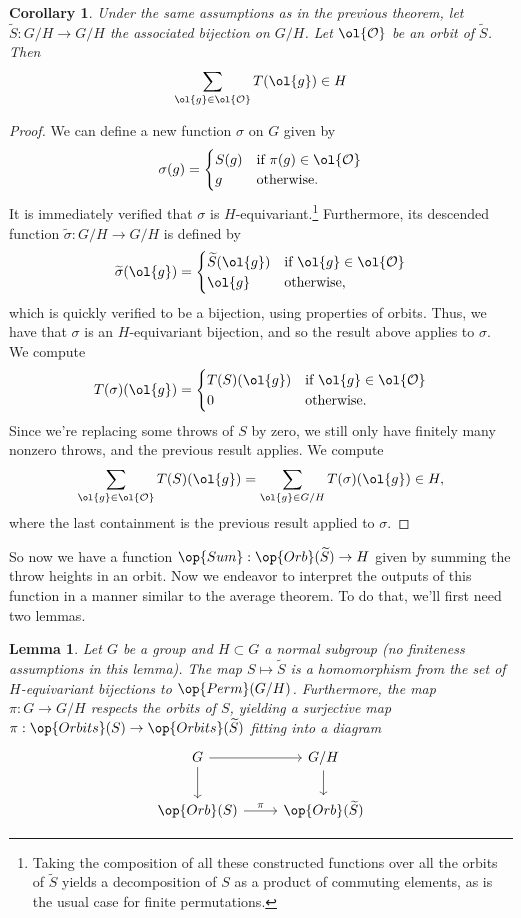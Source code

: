 \documentclass[12nt]{article}
\theoremstyle{plain}
\newtheorem{lemma}{Lemma}
\newtheorem{corollary}[theorem]{Corollary}
\begin{document}
\begin{corollary}
Under the same assumptions as in the previous theorem, let $\widetilde{S} : G/H \to G/H$ the associated bijection on $G/H$. Let $\ol{\mathcal{O}}$ be an orbit of $\widetilde{S}$. Then \[
\sum \limits_{\ol{g} \in \ol{\mathcal{O}}} T(\ol{g}) \in H
\]
\end{corollary}

\begin{proof}
We can define a new function $\sigma$ on $G$ given by 
\[
\sigma(g) = \begin{cases}
S(g) & \text{if } \pi(g) \in \ol{\mathcal{O}} \\
g & \text{otherwise}. 
\end{cases}
\]
It is immediately verified that $\sigma$ is $H$-equivariant.\footnote{Taking the composition of all these constructed functions over all the orbits of $\widetilde{S}$ yields a decomposition of $S$ as a product of commuting elements, as is the usual case for finite permutations.} Furthermore, its descended function $\widetilde{\sigma} : G/H \to G/H$ is defined by
\[
\widetilde{\sigma}(\ol{g}) = \begin{cases}
\widetilde{S}(\ol{g}) & \text{if } \ol{g} \in \ol{\mathcal{O}} \\
\ol{g} & \text{otherwise},
\end{cases}
\]
which is quickly verified to be a bijection, using properties of orbits. Thus, we have that $\sigma$ is an $H$-equivariant bijection, and so the result above applies to $\sigma$. We compute
\[
T(\sigma)(\ol{g}) = \begin{cases}
T(S)(\ol{g}) & \text{if } \ol{g} \in \ol{\mathcal{O}} \\
0 & \text{otherwise}.
\end{cases}
\]
Since we're replacing some throws of $S$ by zero, we still only have finitely many nonzero throws, and the previous result applies. We compute
\[
\sum \limits_{\ol{g} \in \ol{\mathcal{O}}} T(S)(\ol{g}) = \sum \limits_{\ol{g} \in G/H} T(\sigma)(\ol{g}) \in H,
\]
where the last containment is the previous result applied to $\sigma$.
\end{proof}

So now we have a function $\op{Sum} : \op{Orb}(\widetilde{S}) \to H$ given by summing the throw heights in an orbit. Now we endeavor to interpret the outputs of this function in a manner similar to the average theorem. To do that, we'll first need two lemmas.

\begin{lemma}
Let $G$ be a group and $H \subset G$ a normal subgroup (no finiteness assumptions in this lemma). The map $S \mapsto \widetilde{S}$ is a homomorphism from the set of $H$-equivariant bijections to $\op{Perm}(G/H)$. Furthermore, the map $\pi : G \to G/H$ respects the orbits of $S$, yielding a surjective map $\pi : \op{Orbits}(S) \to \op{Orbits}(\widetilde{S})$ fitting into a diagram
\[
\begin{tikzcd}
G \ar[d] \ar[r] & G/H \ar[d] \\
\op{Orb}(S) \ar[r, "\pi"] & \op{Orb}(\widetilde{S})
\end{tikzcd}
\]
\end{lemma}
\end{document}
